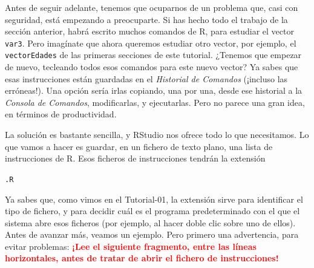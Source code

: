 \documentclass[10pt,a4paper]{article}\usepackage[]{graphicx}\usepackage[]{color}
\begin{document}
Antes de seguir adelante, tenemos que ocuparnos de un problema que, casi con seguridad, está empezando a preocuparte. Si has hecho todo el trabajo de la sección anterior, habrá escrito muchos comandos de R, para estudiar el vector {\tt var3}. Pero imagínate que ahora queremos estudiar otro vector, por ejemplo, el {\tt vectorEdades} de las primeras secciones de este tutorial. ¿Tenemos que empezar de nuevo, tecleando todos esos comandos para este nuevo vector? Ya sabes que esas instrucciones están guardadas en el {\em Historial de Comandos} (¡incluso las erróneas!). Una opción sería irlas copiando, una por una, desde ese historial a la {\em Consola de Comandos}, modificarlas, y ejecutarlas. Pero no parece una gran idea, en términos de productividad.

La solución es bastante sencilla, y RStudio nos ofrece todo lo que necesitamos. Lo que vamos a hacer es guardar, en un fichero de texto plano, una lista de instrucciones de R.  Esos ficheros de instrucciones tendrán la extensión
\begin{center}
  {\tt.R}
\end{center}
Ya sabes que, como vimos en el Tutorial-01, la extensión sirve para identificar el tipo de fichero, y para decidir cuál es el programa predeterminado con el que el sistema abre esos  ficheros (por ejemplo, al hacer doble clic sobre uno de ellos). Antes de avanzar más, veamos un ejemplo. Pero primero una advertencia, para evitar problemas: \textcolor{red}{\bf\large ¡Lee el siguiente fragmento, entre las líneas horizontales, antes de tratar de abrir el fichero de instrucciones!}\\
\end{document}
